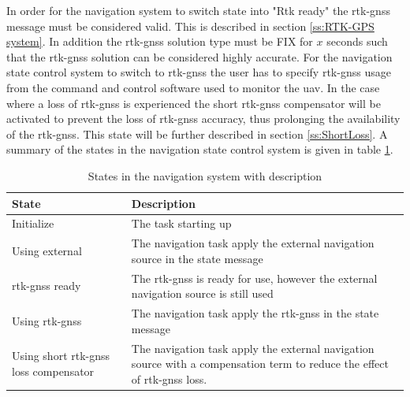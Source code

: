 In order for the navigation system to switch state into "Rtk ready" the \gls{rtk-gnss} message must be considered valid. This is described in section \ref{ss:RTK-GPS system}. In addition the \gls{rtk-gnss} solution type must be FIX for $x$ seconds such that the \gls{rtk-gnss} solution can be considered highly accurate. For the navigation state control system to switch to \gls{rtk-gnss} the user has to specify \gls{rtk-gnss} usage from the command and control software used to monitor the \gls{uav}. In the case where a loss of \gls{rtk-gnss} is experienced the short \gls{rtk-gnss} compensator will be activated to prevent the loss of \gls{rtk-gnss} accuracy, thus prolonging the availability of the \gls{rtk-gnss}. This state will be further described in section \ref{ss:ShortLoss}. A summary of the states in the navigation state control system is given in table \ref{Tb:StateDescription}.
\begin{table}[H]
\begin{tabular}{ | p{3cm} | p{8cm} |}
	\hline 
	\textbf{State}						& \textbf{Description} \\ \hline
	Initialize							& The task starting up\\ \hline
	Using external						& The navigation task apply the external navigation source in the state message\\ \hline
	\gls{rtk-gnss} ready							& The \gls{rtk-gnss} is ready for use, however the external navigation source is still used\\ \hline
	Using \gls{rtk-gnss}							& The navigation task apply the \gls{rtk-gnss} in the state message\\ \hline
	Using short \gls{rtk-gnss} loss compensator	& The navigation task apply the external navigation source with a compensation term to reduce the effect of \gls{rtk-gnss} loss. \\ \hline
\end{tabular}
\caption{States in the navigation system with description}
\label{Tb:StateDescription}
\end{table}
